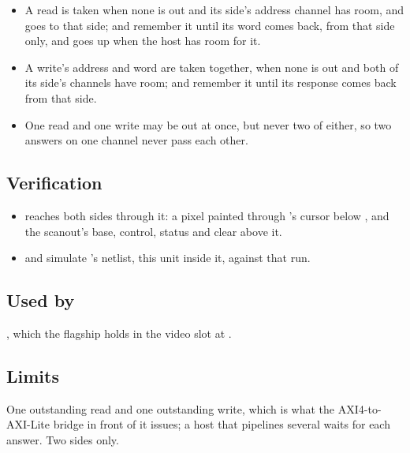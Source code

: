 \begin{itemize}
\item A read is taken when none is out and its side's address channel
has room, and goes to that side;  and  remember
it until its word comes back, from that side only, and goes up when
the host has room for it.
\item A write's address and word are taken together, when none is out
and both of its side's channels have room;  and
 remember it until its response comes back from that side.
\item One read and one write may be out at once, but never two of
either, so two answers on one channel never pass each other.
\end{itemize}

\subsection*{Verification}

\begin{itemize}
\item {} reaches both sides through it: a pixel
painted through 's cursor below , and the
scanout's base, control, status and clear above it.
\item {} and
 simulate 's
netlist, this unit inside it, against that run.
\end{itemize}

\subsection*{Used by}

, which the flagship holds in the video slot at
.

\subsection*{Limits}

One outstanding read and one outstanding write, which is what the
AXI4-to-AXI-Lite bridge in front of it issues; a host that pipelines
several waits for each answer. Two sides only.
